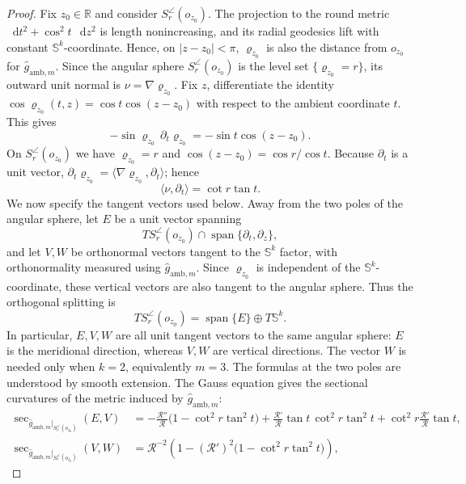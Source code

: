 \documentclass[11pt,reqno]{amsart}
\theoremstyle{definition}
\numberwithin{equation}{section}
\DeclareMathOperator{\vspan}{span}
\newcommand{\dd}{\mathop{}\!\mathrm d}
\begin{document}
\begin{proof}
Fix $z_0\in\mathbb R$ and consider $S_r^{\angle}(o_{z_0})$.
The projection to the
round metric $\dd t^2+\cos^2t\,\dd z^2$ is length nonincreasing, and its
radial geodesics lift with constant $\mathbb S^k$-coordinate.  Hence, on
$|z-z_0|<\pi$, $\varrho_{z_0}$ is also the distance from $o_{z_0}$ for
$\widehat g_{\mathrm{amb},m}$.  Since the angular sphere $S_r^{\angle}(o_{z_0})$ is the level set
$\{\varrho_{z_0}=r\}$, its outward unit normal is
$\nu=\nabla\varrho_{z_0}$.  Fix $z$, differentiate the identity
$\cos\varrho_{z_0}(t,z)=\cos t\cos(z-z_0)$ with respect to the ambient
coordinate $t$. This gives
\[
 -\sin\varrho_{z_0}\,\partial_t\varrho_{z_0}
   =-\sin t\cos(z-z_0).
\]
On $S_r^{\angle}(o_{z_0})$ we have $\varrho_{z_0}=r$ and
$\cos(z-z_0)=\cos r/\cos t$.  Because $\partial_t$ is a unit vector,
$\partial_t\varrho_{z_0}
=\langle\nabla\varrho_{z_0},\partial_t\rangle$; hence
\begin{equation}
\langle\nu,\partial_t\rangle=\cot r\tan t.                       \label{eq:unified-base-3-19}
\end{equation}
We now specify the tangent vectors used below.  Away from the two poles
of the angular sphere, let $E$ be a unit vector spanning
\[
 TS_r^{\angle}(o_{z_0})\cap\vspan\{\partial_t,\partial_z\},
\]
and let $V,W$ be orthonormal vectors tangent to the $\mathbb S^k$
factor, with orthonormality measured using
$\widehat g_{\mathrm{amb},m}$.  Since $\varrho_{z_0}$ is independent of
the $\mathbb S^k$-coordinate, these vertical vectors are also tangent to
the angular sphere.  Thus the orthogonal splitting is
\[
 TS_r^{\angle}(o_{z_0})
   =\vspan\{E\}\oplus T\mathbb S^k.
\]
In particular, $E,V,W$ are all unit tangent vectors to the same angular
sphere: $E$ is the meridional direction, whereas $V,W$ are vertical
directions.  The vector $W$ is needed only when $k=2$, equivalently
$m=3$.  The formulas at the two poles are understood by smooth
extension.
The Gauss equation gives the sectional curvatures of the metric
induced by $\widehat g_{\mathrm{amb},m}$:
\begin{align}
 \sec_{\widehat g_{\mathrm{amb},m}|_{S_r^{\angle}(o_{z_0})}}(E,V)
 &=-\frac{\mathcal R''}{\mathcal R}
       \bigl(1-\cot^2r\tan^2t\bigr)
   +\frac{\mathcal R'}{\mathcal R}\tan t\,\cot^2r\tan^2t
   +\cot^2r\frac{\mathcal R'}{\mathcal R}\tan t,                 \label{eq:unified-base-3-20}\\
 \sec_{\widehat g_{\mathrm{amb},m}|_{S_r^{\angle}(o_{z_0})}}(V,W)
 &=\mathcal R^{-2}\left(
      1-(\mathcal R')^2\bigl(1-\cot^2r\tan^2t\bigr)\right),       \label{eq:unified-base-3-21}

\end{align}
\end{proof}
\end{document}
